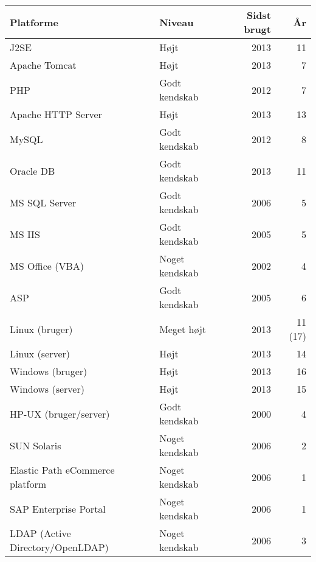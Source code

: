 \documentclass[a4paper,11pt]{article}
\begin{document}
\bigskip
\begin{tabularx}{\textwidth}{X l r r}
  \textbf{Platforme}                & \textbf{Niveau} & \textbf{Sidst brugt} & \textbf{År} \\
  \hline
  J2SE                              & Højt            & 2013                 &     11 \\
  Apache Tomcat                     & Højt            & 2013                 &      7 \\
  PHP                               & Godt kendskab   & 2012                 &      7 \\
  Apache HTTP Server                & Højt            & 2013                 &     13 \\
  MySQL                             & Godt kendskab   & 2012                 &      8 \\
  Oracle DB                         & Godt kendskab   & 2013                 &     11 \\
  MS SQL Server                     & Godt kendskab   & 2006                 &      5 \\
  MS IIS                            & Godt kendskab   & 2005                 &      5 \\
  MS Office (VBA)                   & Noget kendskab  & 2002                 &      4 \\
  ASP                               & Godt kendskab   & 2005                 &      6 \\
  Linux (bruger)                    & Meget højt      & 2013                 & 11 (17)\\
  Linux (server)                    & Højt            & 2013                 &     14 \\
  Windows (bruger)                  & Højt            & 2013                 &     16 \\
  Windows (server)                  & Højt            & 2013                 &     15 \\
  HP-UX (bruger/server)             & Godt kendskab   & 2000                 &      4 \\
  SUN Solaris                       & Noget kendskab  & 2006                 &      2 \\
  Elastic Path eCommerce platform   & Noget kendskab  & 2006                 &      1 \\
  SAP Enterprise Portal             & Noget kendskab  & 2006                 &      1 \\
  LDAP (Active Directory/OpenLDAP)  & Noget kendskab  & 2006                 &      3 \\

\end{tabularx}
\end{document}

